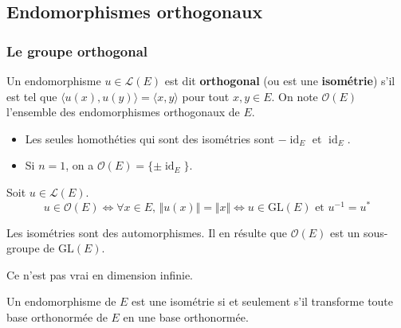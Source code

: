   \subsection{Endomorphismes orthogonaux}

  \label{158-4}

  \subsubsection{Le groupe orthogonal}


  \begin{definition}
    Un endomorphisme $u \in \mathcal{L}(E)$ est dit \textbf{orthogonal} (ou est une \textbf{isométrie}) s'il est tel que $\langle u(x), u(y) \rangle = \langle x, y \rangle$ pour tout $x, y \in E$. On note $\mathcal{O}(E)$ l'ensemble des endomorphismes orthogonaux de $E$.
  \end{definition}

  \begin{example}
    \begin{itemize}
      \item Les seules homothéties qui sont des isométries sont $-\operatorname{id}_E$ et $\operatorname{id}_E$.
      \item Si $n = 1$, on a $\mathcal{O}(E) = \{ \pm \operatorname{id}_E \}$.
    \end{itemize}
  \end{example}


  \begin{proposition}
    Soit $u \in \mathcal{L}(E)$.
    \[ u \in \mathcal{O}(E) \iff \forall x \in E, \, \Vert u(x) \Vert = \Vert x \Vert \iff u \in \mathrm{GL}(E) \text{ et } u^{-1} = u^* \]
  \end{proposition}


  \begin{theorem}
    Les isométries sont des automorphismes. Il en résulte que $\mathcal{O}(E)$ est un sous-groupe de $\mathrm{GL}(E)$.
  \end{theorem}

  \begin{remark}
    Ce n'est pas vrai en dimension infinie.
  \end{remark}

  \begin{theorem}
    Un endomorphisme de $E$ est une isométrie si et seulement s'il transforme toute base orthonormée de $E$ en une base orthonormée.
  \end{theorem}

